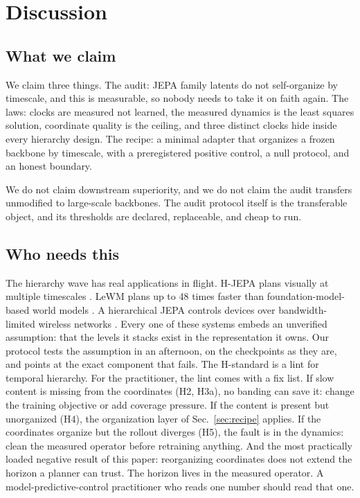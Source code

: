 \documentclass[11pt]{article}
\begin{document}
\section{Discussion}
\label{sec:discussion}

\subsection{What we claim}

We claim three things.
The audit: JEPA family latents do not self-organize by timescale, and this is measurable, so nobody needs to take it on faith again.
The laws: clocks are measured not learned, the measured dynamics is the least squares solution, coordinate quality is the ceiling, and three distinct clocks hide inside every hierarchy design.
The recipe: a minimal adapter that organizes a frozen backbone by timescale, with a preregistered positive control, a null protocol, and an honest boundary.

We do not claim downstream superiority, and we do not claim the audit transfers unmodified to large-scale backbones.
The audit protocol itself is the transferable object, and its thresholds are declared, replaceable, and cheap to run.

\subsection{Who needs this}

The hierarchy wave has real applications in flight.
H-JEPA plans visually at multiple timescales \citep{hjepa}.
LeWM plans up to 48 times faster than foundation-model-based world models \citep{lewm}.
A hierarchical JEPA controls devices over bandwidth-limited wireless networks \citep{jeapa5g}.
Every one of these systems embeds an unverified assumption: that the levels it stacks exist in the representation it owns.
Our protocol tests the assumption in an afternoon, on the checkpoints as they are, and points at the exact component that fails.
The H-standard is a lint for temporal hierarchy.
For the practitioner, the lint comes with a fix list.
If slow content is missing from the coordinates (H2, H3a), no banding can save it: change the training objective or add coverage pressure.
If the content is present but unorganized (H4), the organization layer of Sec.~\ref{sec:recipe} applies.
If the coordinates organize but the rollout diverges (H5), the fault is in the dynamics: clean the measured operator before retraining anything.
And the most practically loaded negative result of this paper: reorganizing coordinates does not extend the horizon a planner can trust.
The horizon lives in the measured operator.
A model-predictive-control practitioner who reads one number should read that one.
\end{document}
